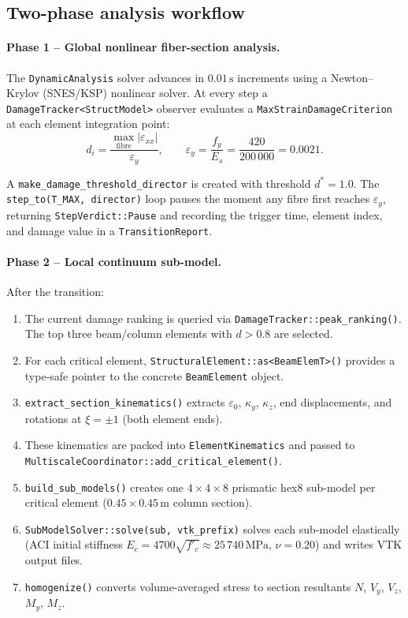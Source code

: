 \subsection{Two-phase analysis workflow}

\paragraph{Phase 1 -- Global nonlinear fiber-section analysis.}
The \texttt{DynamicAnalysis} solver advances in $0.01\,\text{s}$ increments
using a Newton--Krylov (SNES/KSP) nonlinear solver.
At every step a \texttt{DamageTracker<StructModel>} observer evaluates a
\texttt{MaxStrainDamageCriterion} at each element integration point:
%
\begin{equation}
  d_i = \frac{\max_\text{fibre}|\varepsilon_{xx}|}{\varepsilon_y},
  \qquad
  \varepsilon_y = \frac{f_y}{E_s} = \frac{420}{200\,000} = 0.0021.
\end{equation}

A \texttt{make\_damage\_threshold\_director} is created with threshold
$d^* = 1.0$.  The \texttt{step\_to(T\_MAX, director)} loop
pauses the moment any fibre first reaches $\varepsilon_y$, returning
\texttt{StepVerdict::Pause} and recording the trigger time, element index,
and damage value in a \texttt{TransitionReport}.

\paragraph{Phase 2 -- Local continuum sub-model.}
After the transition:
\begin{enumerate}
  \item The current damage ranking is queried via
        \texttt{DamageTracker::peak\_ranking()}.  The top three
        beam/column elements with $d > 0.8$ are selected.
  \item For each critical element, \texttt{StructuralElement::as<BeamElemT>()}
        provides a type-safe pointer to the concrete
        \texttt{BeamElement} object.
  \item \texttt{extract\_section\_kinematics()} extracts
        $\varepsilon_0$, $\kappa_y$, $\kappa_z$, end displacements, and
        rotations at $\xi = \pm 1$ (both element ends).
  \item These kinematics are packed into \texttt{ElementKinematics} and
        passed to \texttt{MultiscaleCoordinator::add\_critical\_element()}.
  \item \texttt{build\_sub\_models()} creates one
        $4\times4\times8$ prismatic hex8 sub-model per critical element
        ($0.45\times0.45\,\text{m}$ column section).
  \item \texttt{SubModelSolver::solve(sub, vtk\_prefix)} solves each
        sub-model elastically (ACI initial stiffness
        $E_c = 4700\sqrt{f'_c} \approx 25\,740\,\text{MPa}$,
        $\nu = 0.20$) and writes VTK output files.
  \item \texttt{homogenize()} converts volume-averaged stress to section
        resultants $N$, $V_y$, $V_z$, $M_y$, $M_z$.
\end{enumerate}


